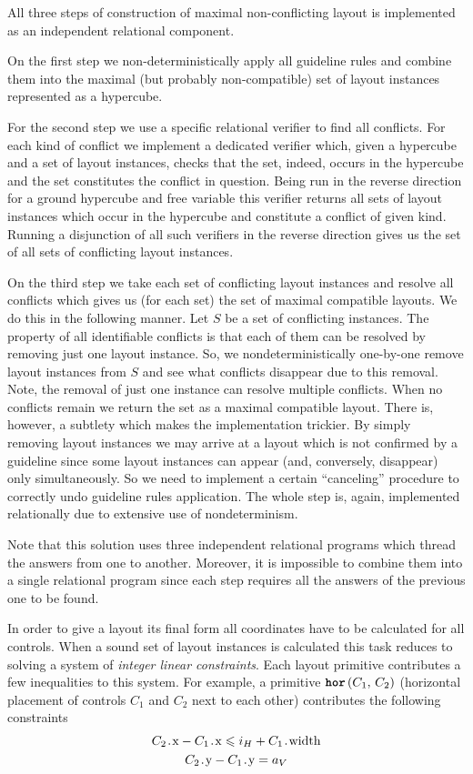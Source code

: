 All three steps of construction of maximal non-conflicting layout is implemented as an independent relational component.

On the first step we non-deterministically apply all guideline rules and combine them into the maximal
(but probably non-compatible) set of layout instances represented as a hypercube.

For the second step we use a specific relational verifier to find all conflicts.
For each kind of conflict we implement
a dedicated verifier which, given a hypercube and a set of layout instances, checks that the set, indeed, occurs in the hypercube and the set constitutes the conflict in question.
Being run in the reverse direction for a ground hypercube and free variable this verifier returns all
sets of layout instances which occur in the hypercube and constitute a conflict of given kind.
Running a disjunction of all such verifiers in the reverse direction gives us the set of all sets of conflicting layout instances.

On the third step we take each set of conflicting layout instances and resolve all conflicts which gives us (for each set) the set of maximal compatible layouts.
We do this in the following manner.
Let $S$ be a set of conflicting instances.
The property of all identifiable conflicts is that each of them can be resolved by removing just one layout instance.
So, we nondeterministically one-by-one remove layout instances from $S$ and see what conflicts disappear due to this removal.
Note, the removal of just one instance can resolve multiple conflicts. When no conflicts remain we return the set as a maximal compatible layout.
There is, however, a subtlety which makes the implementation trickier.
By simply removing layout instances we may arrive at a layout which is not confirmed by a guideline since some layout instances can appear (and,
conversely, disappear) only simultaneously.
So we need to implement a certain ``canceling'' procedure to correctly
undo guideline rules application.
The whole step is, again, implemented relationally due to extensive use of
nondeterminism.

Note that this solution uses three independent relational programs which thread the answers from one to another.
Moreover, it is impossible to combine them into a single relational program since each step requires all the answers
of the previous one to be found.


In order to give a layout its final form all coordinates have to be calculated for all controls.
When a sound set of layout instances is calculated this task reduces to solving a system of \emph{integer linear constraints}.
Each layout primitive contributes a few inequalities to this system.
For example, a primitive $\mbox{\texttt{\textbf{hor}}}\,(C_1,\,C_2)$ (horizontal placement of controls $C_1$ and $C_2$ next to each other) contributes the following constraints
\begin{gather*}
  C_2\prg{.x} - C_1\prg{.x} \leq i_H + C_1\prg{.width}\\
  C_2\prg{.y} - C_1\prg{.y} = a_V
\end{gather*}

